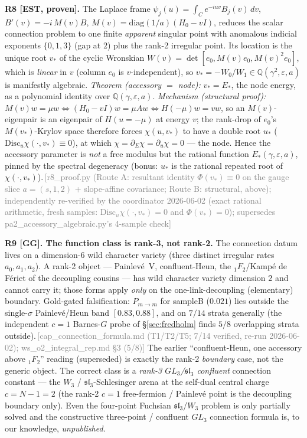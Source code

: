 \documentclass[aps,prd,reprint,nofootinbib]{revtex4-2}
\newcommand{\pnote}[1]{\textcolor{gray}{\footnotesize\,[#1]}}
\newcommand{\eps}{\varepsilon}
\newcommand{\Pmid}{P_{m\to m}}   %
\begin{document}
\textbf{R8 [EST, proven].} The Laplace frame $\psi_j(u)=\int_C e^{-iuv}B_j(v)\,dv$,
$B'(v)=-i\,M(v)B$, $M(v)=\mathrm{diag}(1/a)(H_0-vI)$, reduces the scalar connection problem to one
finite \emph{apparent} singular point with anomalous indicial exponents $\{0,1,3\}$ (gap at $2$) plus
the rank-2 irregular point. Its location is the unique root $v_*$ of the cyclic Wronskian
$W(v)=\det[e_0,M(v)e_0,M(v)^2e_0]$, which is \emph{linear} in $v$ (column $e_0$ is $v$-independent),
so $v_*=-W_0/W_1\in\mathbb{Q}(\gamma^2,\eps,a)$ is manifestly algebraic. \emph{Theorem
(accessory $=$ node):} $v_*=E_*$, the node energy, as a polynomial identity over
$\mathbb{Q}(\gamma,\eps,a)$. \emph{Mechanism (structural proof):} $M(v)w=\mu w \Leftrightarrow
(H_0-vI)w=\mu Aw \Leftrightarrow H(-\mu)w=vw$, so an $M(v)$-eigenpair is an eigenpair of $H(u{=}{-}\mu)$
at energy $v$; the rank-drop of $e_0$'s $M(v_*)$-Krylov space therefore forces $\chi(u,v_*)$ to have a
double root $u_*$ ($\mathrm{Disc}_u\chi(\cdot,v_*)\equiv0$), at which $\chi=\partial_E\chi=\partial_u\chi=0$
--- the node. Hence the accessory parameter is \emph{not} a free modulus but the rational function
$E_*(\gamma,\eps,a)$, pinned by the spectral degeneracy (bonus: $u_*$ is the rational repeated root of
$\chi(\cdot,v_*)$).\pnote{r8\_proof.py (Route A: resultant identity $\Phi(v_*)\equiv0$ on the gauge slice
$a{=}(s,1,2)$ + slope-affine covariance; Route B: structural, above); independently re-verified by the
coordinator 2026-06-02 (exact rational arithmetic, fresh samples: $\mathrm{Disc}_u\chi(\cdot,v_*)=0$ and
$\Phi(v_*)=0$); supersedes pa2\_accessory\_algebraic.py's 4-sample check}

\textbf{R9 [GG]. The function class is rank-3, not rank-2.} The connection datum lives on a
dimension-$6$ wild character variety (three distinct irregular rates $a_0,a_1,a_2$). A rank-2
object --- Painlev\'e~V, confluent-Heun, the ${}_1F_2$/Kamp\'e de F\'eriet of the decoupling cousins
--- has wild character variety dimension $2$ and cannot carry it; those forms apply \emph{only} on
the one-link-decoupling (elementary) boundary. Gold-gated falsification: $\Pmid$ for sampleB
($0.021$) lies outside the single-$\sigma$ Painlev\'e/Heun band $[0.83,0.88]$, and on $7/14$
strata generally (the independent $c{=}1$ Barnes-$G$ probe of \S\ref{sec:fredholm} finds $5/8$
overlapping strata outside).\pnote{cap\_connection\_formula.md (T1/T2/T5; 7/14 verified, re-run
2026-06-02); ws\_o2\_integral\_rep.md \S3 (5/8)} The earlier ``confluent-Heun, one accessory above ${}_1F_2$'' reading
(superseded) is exactly the rank-2 \emph{boundary} case, not the generic object. The correct class is
a \emph{rank-3 $GL_3$/$\mathfrak{sl}_3$ confluent} connection constant --- the $W_3$ /
$\mathfrak{sl}_3$-Schlesinger arena at the self-dual central charge $c=N{-}1=2$ (the rank-2 $c{=}1$
free-fermion / Painlev\'e point is the decoupling boundary only). Even the four-point Fuchsian
$\mathfrak{sl}_3$/$W_3$ problem is only partially solved and the constructive three-point / confluent
$GL_3$ connection formula is, to our knowledge, \emph{unpublished}.
\end{document}
